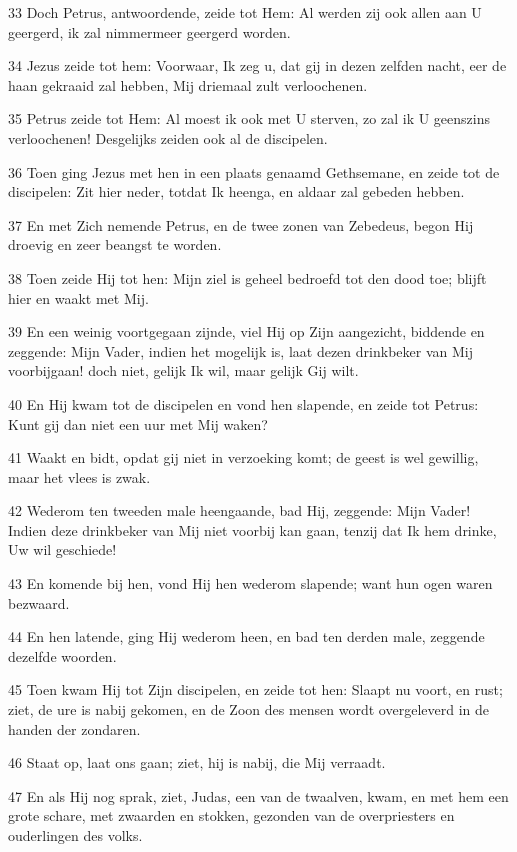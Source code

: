 \par 33 Doch Petrus, antwoordende, zeide tot Hem: Al werden zij ook allen aan U geergerd, ik zal nimmermeer geergerd worden.
\par 34 Jezus zeide tot hem: Voorwaar, Ik zeg u, dat gij in dezen zelfden nacht, eer de haan gekraaid zal hebben, Mij driemaal zult verloochenen.
\par 35 Petrus zeide tot Hem: Al moest ik ook met U sterven, zo zal ik U geenszins verloochenen! Desgelijks zeiden ook al de discipelen.
\par 36 Toen ging Jezus met hen in een plaats genaamd Gethsemane, en zeide tot de discipelen: Zit hier neder, totdat Ik heenga, en aldaar zal gebeden hebben.
\par 37 En met Zich nemende Petrus, en de twee zonen van Zebedeus, begon Hij droevig en zeer beangst te worden.
\par 38 Toen zeide Hij tot hen: Mijn ziel is geheel bedroefd tot den dood toe; blijft hier en waakt met Mij.
\par 39 En een weinig voortgegaan zijnde, viel Hij op Zijn aangezicht, biddende en zeggende: Mijn Vader, indien het mogelijk is, laat dezen drinkbeker van Mij voorbijgaan! doch niet, gelijk Ik wil, maar gelijk Gij wilt.
\par 40 En Hij kwam tot de discipelen en vond hen slapende, en zeide tot Petrus: Kunt gij dan niet een uur met Mij waken?
\par 41 Waakt en bidt, opdat gij niet in verzoeking komt; de geest is wel gewillig, maar het vlees is zwak.
\par 42 Wederom ten tweeden male heengaande, bad Hij, zeggende: Mijn Vader! Indien deze drinkbeker van Mij niet voorbij kan gaan, tenzij dat Ik hem drinke, Uw wil geschiede!
\par 43 En komende bij hen, vond Hij hen wederom slapende; want hun ogen waren bezwaard.
\par 44 En hen latende, ging Hij wederom heen, en bad ten derden male, zeggende dezelfde woorden.
\par 45 Toen kwam Hij tot Zijn discipelen, en zeide tot hen: Slaapt nu voort, en rust; ziet, de ure is nabij gekomen, en de Zoon des mensen wordt overgeleverd in de handen der zondaren.
\par 46 Staat op, laat ons gaan; ziet, hij is nabij, die Mij verraadt.
\par 47 En als Hij nog sprak, ziet, Judas, een van de twaalven, kwam, en met hem een grote schare, met zwaarden en stokken, gezonden van de overpriesters en ouderlingen des volks.
